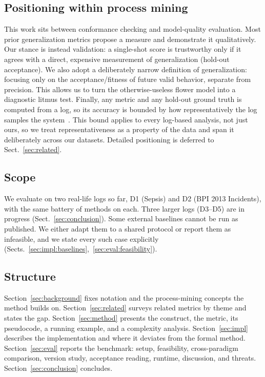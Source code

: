 \documentclass[runningheads]{llncs}
\begin{document}
\subsection{Positioning within process mining}
This work sits between conformance checking and model-quality evaluation. Most prior generalization metrics propose a measure and demonstrate it qualitatively. Our stance is instead validation: a single-shot score is trustworthy only if it agrees with a direct, expensive measurement of generalization (hold-out acceptance). We also adopt a deliberately narrow definition of generalization: focusing only on the acceptance/fitness of future valid behavior, separate from precision. This allows us to turn the otherwise-useless flower model into a diagnostic litmus test. Finally, any metric and any hold-out ground truth is computed from a log, so its accuracy is bounded by how representatively the log samples the system~\cite{karunaratne2024representativeness}. This bound applies to every log-based analysis, not just ours, so we treat representativeness as a property of the data and span it deliberately across our datasets. Detailed positioning is deferred to Sect.~\ref{sec:related}.

\subsection{Scope}
\label{sec:scope}
We evaluate on two real-life logs so far, D1 (Sepsis) and D2 (BPI 2013 Incidents), with the same battery of methods on each. Three larger logs (D3--D5) are in progress (Sect.~\ref{sec:conclusion}). Some external baselines cannot be run as published. We either adapt them to a shared protocol or report them as infeasible, and we state every such case explicitly (Sects.~\ref{sec:impl:baselines},~\ref{sec:eval:feasibility}).

\subsection{Structure}
Section~\ref{sec:background} fixes notation and the process-mining concepts the method builds on. Section~\ref{sec:related} surveys related metrics by theme and states the gap. Section~\ref{sec:method} presents the construct, the metric, its pseudocode, a running example, and a complexity analysis. Section~\ref{sec:impl} describes the implementation and where it deviates from the formal method. Section~\ref{sec:eval} reports the benchmark: setup, feasibility, cross-paradigm comparison, version study, acceptance reading, runtime, discussion, and threats. Section~\ref{sec:conclusion} concludes.
\end{document}
